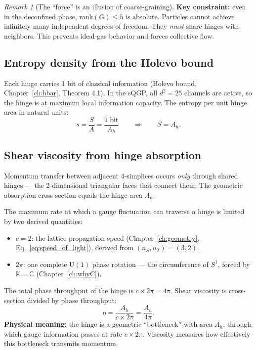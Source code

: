 \documentclass[12pt]{article}
\theoremstyle{remark}
\newtheorem{remark}[theorem]{Remark}
\theoremstyle{definition}
\newcommand{\CC}{\mathbb{C}}
\begin{document}
\begin{remark}[The ``force'' is an illusion of coarse-graining]
\textbf{Key constraint:} even in the deconfined phase, $\text{rank}(G) \leq 5$ is absolute. Particles cannot achieve infinitely many independent degrees of freedom. They \emph{must} share hinges with neighbors. This prevents ideal-gas behavior and forces collective flow.

\subsection{Entropy density from the Holevo bound}

Each hinge carries 1 bit of classical information (Holevo bound, Chapter~\ref{ch:hbar}, Theorem 4.1). In the sQGP, all $d^2 = 25$ channels are active, so the hinge is at maximum local information capacity. The entropy per unit hinge area in natural units:
\begin{equation}
s = \frac{S}{A} = \frac{1\;\text{bit}}{A_h} \qquad\Rightarrow\qquad S = A_h.
\end{equation}

\subsection{Shear viscosity from hinge absorption}

Momentum transfer between adjacent 4-simplices occurs \emph{only} through shared hinges --- the 2-dimensional triangular faces that connect them. The geometric absorption cross-section equals the hinge area $A_h$.

The maximum rate at which a gauge fluctuation can traverse a hinge is limited by two derived quantities:
\begin{itemize}
\item $c = 2$: the lattice propagation speed (Chapter~\ref{ch:geometry}, Eq.~\ref{eq:speed_of_light}), derived from $(n_S, n_T) = (3, 2)$.
\item $2\pi$: one complete $\text{U}(1)$ phase rotation --- the circumference of $S^1$, forced by $\mathbb{K} = \CC$ (Chapter~\ref{ch:whyC}).
\end{itemize}

The total phase throughput of the hinge is $c \times 2\pi = 4\pi$. Shear viscosity is cross-section divided by phase throughput:
\begin{equation}
\eta = \frac{A_h}{c \times 2\pi} = \frac{A_h}{4\pi}.
\end{equation}
\textbf{Physical meaning:} the hinge is a geometric ``bottleneck'' with area $A_h$, through which gauge information passes at rate $c \times 2\pi$. Viscosity measures how effectively this bottleneck transmits momentum.


\end{remark}
\end{document}
